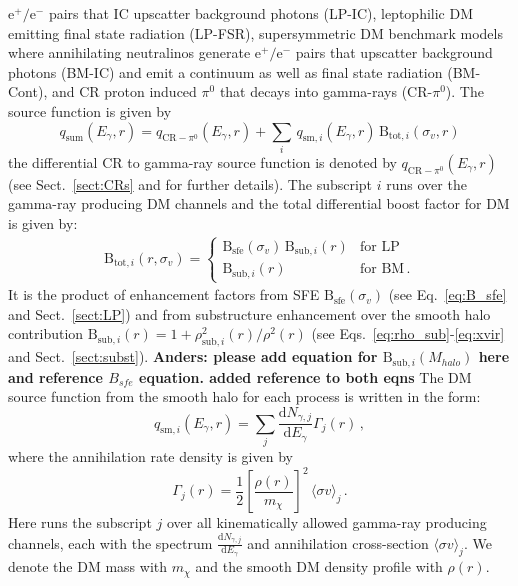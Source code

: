\documentclass[10pt,aps,pra,reprint,amsmath,amsfonts,amssymb,showpacs,nofootinbib,floatfix]{revtex4-1}
\newcommand{\rmn}{\mathrm}
\newcommand{\sfe}{\rmn{sfe}}
\newcommand{\sub}{\rmn{sub}}
\newcommand{\B}{\rmn{B}}
\newcommand{\qCR}{q_{\rmn{CR}-\ensuremath{\pi^0}}}
\newcommand{\dd}{\rmn{d}}
\newcommand{\mx}{\ensuremath{m_{\chi}}}
\newcommand{\ngammaj}{\ensuremath{N_{\gamma,j}}}
\newcommand{\sigmaannv}{\ensuremath{\langle\sigma v\rangle}}
\newcommand{\sigv}{\ensuremath{\sigma_v}}
\newcommand{\egamma}{\ensuremath{E_{\gamma}}}
\newcommand{\eg}{E_\gamma}
\begin{document}
$\rmn{e}^+/\rmn{e}^-$ pairs that IC upscatter background photons
(LP-IC), leptophilic DM emitting final state radiation (LP-FSR),
supersymmetric DM benchmark models where annihilating neutralinos
generate $\rmn{e}^+/\rmn{e}^-$ pairs that upscatter background photons
(BM-IC) and emit a continuum as well as final state radiation
(BM-Cont), and CR proton induced $\pi^0$ that decays into gamma-rays
(CR-$\pi^0$). The source function is given by
\begin{equation}
q_\rmn{sum} (\eg,r) = \qCR(\eg,r)+
\sum_i \,q_{\rmn{sm},i}(\eg,r)\,\B_{\rmn{tot},i}(\sigv,r)
\end{equation}
the differential CR to gamma-ray source function is denoted by
$\qCR(\eg,r)$ (see Sect.~\ref{sect:CRs} and \cite{2010MNRAS.409..449P}
for further details). The subscript $i$ runs over the gamma-ray
producing DM channels and the total differential boost factor for DM
is given by:
\begin{eqnarray}
\B_{\rmn{tot},i}(r,\sigv) = \left\{\begin{array}{cc}
\B_\sfe(\sigv)\,\B_{\sub,i}(r) &\rmn{for\,\,LP}\\
\B_{\sub,i}(r) &\rmn{for\,\,BM\,.}\end{array}\right.
\end{eqnarray}
It is the product of enhancement factors from SFE $\B_\sfe(\sigv)$
(see Eq.~\ref{eq:B_sfe} and Sect.~\ref{sect:LP}) and from substructure
enhancement over the smooth halo contribution $\B_{\sub,i}(r) =
1+\rho_{\sub,i}^2(r)/\rho^2(r)$ (see
Eqs.~\ref{eq:rho_sub}-\ref{eq:xvir} and Sect.~\ref{sect:subst}). {\bf
  Anders: please add equation for $\B_{\sub,i}(M_{halo})$ here and
  reference $B_{sfe}$ equation. added reference to both eqns} The DM
source function from the smooth halo for each process is written in
the form:
\begin{equation}
\label{eq:q_sm}
q_{\rmn{sm},i} (\egamma,r) = \sum_j
\frac{\dd \ngammaj}{\dd E_\gamma} \Gamma_j(r)\,,
\end{equation}
where the annihilation rate density is given by 
\begin{equation}
\label{eq:ann_rate}
\Gamma_j(r) = \frac{1}{2} \left[\frac{\rho(r)}{\mx}\right]^2 
\, \sigmaannv_j\,.
\end{equation}
Here runs the subscript $j$ over all kinematically allowed gamma-ray
producing channels, each with the spectrum $\frac{\dd
  \ngammaj}{\dd\eg}$ and annihilation cross-section $\sigmaannv_j$.
We denote the DM mass with $\mx$ and the smooth DM density profile
with $\rho(r)$.
\end{document}
